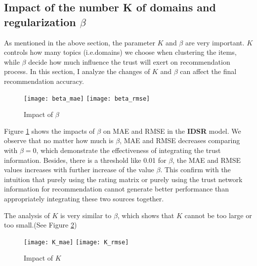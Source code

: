 \subsection{Impact of the number K of domains and regularization $\beta$}
As mentioned in the above section, the parameter $K$ and $\beta$ are very important. $K$ controls how many topics (i.e.domains) we choose when clustering the items, while $\beta$ decide how much influence the trust will exert on recommendation process. In this section, I analyze the changes of $K$ and $\beta$ can affect the final recommendation accuracy.

\begin{figure}[h]
	\caption{Impact of $\beta$}
	\label{fig:beta}
	\texttt{[image: beta\_mae]}
	\texttt{[image: beta\_rmse]}
\end{figure}

Figure \ref{fig:beta} shows the impacts of $\beta$ on MAE and RMSE in the \textbf{IDSR} model. We observe that no matter how much is $\beta$, MAE and RMSE decreases comparing with $\beta = 0$, which demonstrate the effectiveness of integrating the trust information. Besides, there is a threshold like 0.01 for $\beta$, the MAE and RMSE values increases with further increase of the value $\beta$. This confirm with the intuition that purely using the rating matrix or purely using the trust network information for recommendation cannot generate better performance than appropriately integrating these two sources together.

The analysis of $K$ is very similar to $\beta$, which shows that $K$ cannot be too large or too small.(See Figure \ref{fig:k})
\begin{figure}[h]
	\caption{Impact of $K$}
	\label{fig:k}
	\texttt{[image: K\_mae]}
	\texttt{[image: K\_rmse]}
\end{figure}

